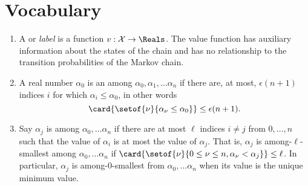 \documentclass[12pt]{article}
\begin{document}
\section*{Vocabulary}
\begin{enumerate}
    \item
        A  or \emph{label} is a function \( v :
        \mathcal{X} \to \Reals \).  The value function has auxiliary
        information about the states of the chain and has no
        relationship to the transition probabilities of the Markov
        chain.
    \item
        A real number \( \alpha_0 \) is an 
        among \( \alpha_0, \alpha_1, \dots \alpha_n \) if there are, at
        most, \( \epsilon(n + 1) \) indices \( i \) for which \( \alpha_i
        \le \alpha_0 \), in other words
        \[
            \card{ \setof{\nu}{\alpha_{\nu} \le \alpha_0}} \le \epsilon(n+1).
        \]

    \item
        Say \( \alpha_j \) is  among \(
        \alpha_0, \dots \alpha_n \) if there are at most \( \ell \)
        indices \( i \ne j \) from \( 0, \dots, n \) such that the value
        of \( \alpha_i \) is at most the value of \( \alpha_j \).  That
        is, \( \alpha_j \) is among-\( \ell \)-smallest among \( \alpha_0,
        \dots \alpha_n \) if \( \card{ \setof{\nu}{0 \le \nu \le n,
        \alpha_\nu < \alpha_j}} \le \ell \).  In particular, \( \alpha_j
        \) is among-\( 0 \)-smallest from \( \alpha_0, \dots \alpha_n \)
        when its value is the unique minimum value.
\end{enumerate}

\hr
\end{document}
